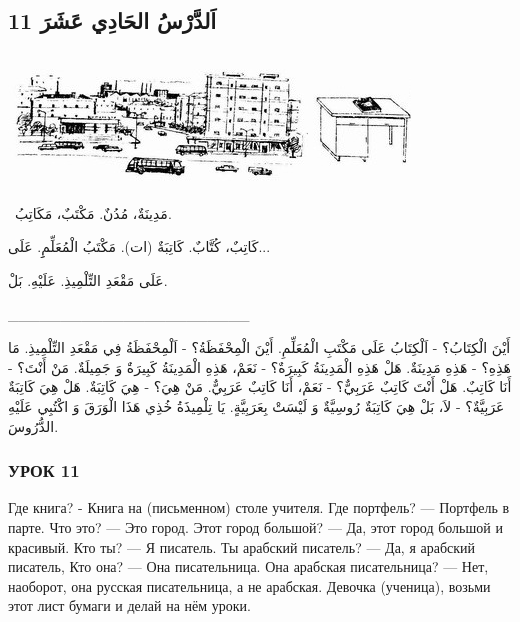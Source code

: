\documentclass[a5paper]{article}
\begin{document}
\subsection{11 اَلدَّرْسُ الحَادِي عَشَرَ}
 \includegraphics[width=3.1252in,height=1.3752in]{MuhammadBagauddinlatinized-img017.jpg}   \includegraphics[width=1.0209in,height=1.3646in]{MuhammadBagauddinlatinized-img018.jpg} 

\ مَدِينَةٌ، مُدُنٌ. مَكْتَبٌ، مَكَاتِبُ.

كَاتِبٌ، كُتَّابٌ. كَاتِبَةٌ (ات). مَكْتَبُ الْمُعَلِّمِِ. عَلَى...

عَلَى مَقْعَدِ التِّلْمِيذِ. عَلَيْهِ. بَلْ.

\_\_\_\_\_\_\_\_\_\_\_\_\_\_\_\_\_\_\_\_\_\_\_ 

أَيْنَ الْكِتَابُ؟ - اَلْكِتَابُ عَلَى مَكْتَبِ الْمُعَلِّمِ. أَيْنَ الْمِحْفَظَةُ؟ - اَلْمِحْفَظَةُ فِي مَقْعَدِ التِّلْمِيذِ. مَا هَذِهِ؟ - هَذِهِ مَدِينَةٌ. هَلْ هَذِهِ الْمَدِينَةُ كَبِيرَةٌ؟ - نَعَمْ، هَذِهِ الْمَدِينَةُ كَبِيرَةٌ وَ جَمِيلَةٌ. مَنْ أَنْتَ؟ - أَنَا كَاتِبٌ. هَلْ أَنْتَ كَاتِبٌ عَرَبِيٌّ؟ - نَعَمْ، أَنَا كَاتِبٌ عَرَبِيٌّ. مَنْ هِيَ؟ - هِيَ كَاتِبَةٌ. هَلْ هِيَ كَاتِبَةٌ عَرَبِيَّةٌ؟ - لاَ، بَلْ هِيَ كَاتِبَةٌ رُوسِيَّةٌ وَ لَيْسَتْ بِعَرَبِيَّةٍ. يَا تِلْمِيذَةُ خُذِي هَذَا الْوَرَقَ وَ اكْتُبِي عَلَيْهِ الدُّرُوسَ.

\subsubsection{УРОК 11}
Где книга? - Книга на (письменном) столе учителя. Где порт­фель? — Портфель в парте. Что это? — Это город. Этот город большой? — Да, этот город большой и красивый. Кто ты? — Я писатель. Ты арабский писатель? — Да, я арабский писатель, Кто она? — Она писательница. Она арабская писательница? — Нет, наоборот, она русская писательница, а не арабская. Девочка (ученица), возьми этот лист бумаги и делай на нём уроки.
\end{document}
